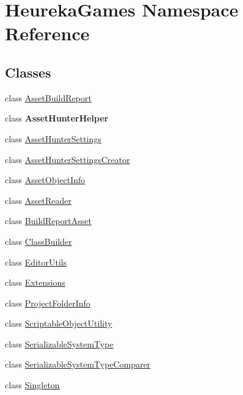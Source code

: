 \hypertarget{namespace_heureka_games}{}\section{Heureka\+Games Namespace Reference}
\label{namespace_heureka_games}
\subsection*{Classes}
\begin{DoxyCompactItemize}
\item 
class \hyperlink{class_heureka_games_1_1_asset_build_report}{Asset\+Build\+Report}
\item 
class {\bfseries Asset\+Hunter\+Helper}
\item 
class \hyperlink{class_heureka_games_1_1_asset_hunter_settings}{Asset\+Hunter\+Settings}
\item 
class \hyperlink{class_heureka_games_1_1_asset_hunter_settings_creator}{Asset\+Hunter\+Settings\+Creator}
\item 
class \hyperlink{class_heureka_games_1_1_asset_object_info}{Asset\+Object\+Info}
\item 
class \hyperlink{class_heureka_games_1_1_asset_reader}{Asset\+Reader}
\item 
class \hyperlink{class_heureka_games_1_1_build_report_asset}{Build\+Report\+Asset}
\item 
class \hyperlink{class_heureka_games_1_1_class_builder}{Class\+Builder}
\item 
class \hyperlink{class_heureka_games_1_1_editor_utils}{Editor\+Utils}
\item 
class \hyperlink{class_heureka_games_1_1_extensions}{Extensions}
\item 
class \hyperlink{class_heureka_games_1_1_project_folder_info}{Project\+Folder\+Info}
\item 
class \hyperlink{class_heureka_games_1_1_scriptable_object_utility}{Scriptable\+Object\+Utility}
\item 
class \hyperlink{class_heureka_games_1_1_serializable_system_type}{Serializable\+System\+Type}
\item 
class \hyperlink{class_heureka_games_1_1_serializable_system_type_comparer}{Serializable\+System\+Type\+Comparer}
\item 
class \hyperlink{class_heureka_games_1_1_singleton}{Singleton}
\end{DoxyCompactItemize}
